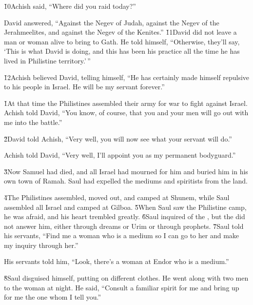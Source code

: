 \v{10}Achish said, ``Where did you raid today?''

David answered, ``Against the Negev of Judah, against the Negev of the Jerahmeelites, and against the Negev of the Kenites.'' \v{11}David did not leave a man or woman alive to bring to Gath. He told himself, ``Otherwise, they'll say, `This is what David is doing, and this has been his practice all the time he has lived in Philistine territory.'\,''

\v{12}Achish believed David, telling himself, ``He has certainly made himself repulsive to his people in Israel. He will be my servant forever.''

\v{1}At that time the Philistines assembled their army for war to fight against Israel. Achish told David, ``You know, of course, that you and your men will go out with me into the battle.''

\v{2}David told Achish, ``Very well, you will now see what your servant will do.''

Achish told David, ``Very well, I'll appoint you as my permanent bodyguard.''

\v{3}Now Samuel had died, and all Israel had mourned for him and buried him in his own town of Ramah. Saul had expelled the mediums and spiritists from the land.

\v{4}The Philistines assembled, moved out, and camped at Shunem, while Saul assembled all Israel and camped at Gilboa. \v{5}When Saul saw the Philistine camp, he was afraid, and his heart trembled greatly. \v{6}Saul inquired of the , but the  did not answer him, either through dreams or Urim or through prophets. \v{7}Saul told his servants, ``Find me a woman who is a medium so I can go to her and make my inquiry through her.''

His servants told him, ``Look, there's a woman at Endor who is a medium.''

\v{8}Saul disguised himself, putting on different clothes. He went along with two men to the woman at night. He said, ``Consult a familiar spirit for me and bring up for me the one whom I tell you.''

